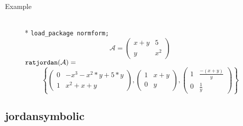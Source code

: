 \begin{description}
\item[Example]\mbox{}\\*
\texttt{load\_package normform;}
\[
\mathcal{A} = \begin{pmatrix} x+y & 5 \\ y & x^2 \end{pmatrix}
\]
\(
\texttt{ratjordan}(\mathcal{A}) =
\)
\[
\left\{
    \begin{pmatrix} 0 & -x^3-x^2*y+5*y \\[1mm] 1 & x^2+x+y \end{pmatrix},
    \begin{pmatrix} 1 & x+y \\[1mm] 0 & y \end{pmatrix},
    \begin{pmatrix} 1 & \frac{-(x+y)}{y} \\[1mm] 0 &  \frac{1}{y} \end{pmatrix}
  \right\}
\]
\end{description}

\subsection{jordansymbolic}

